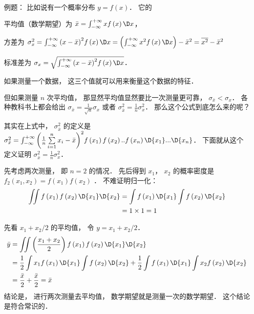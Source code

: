 
例题： 比如说有一个概率分布 $y = f\left( x \right)$．  它的

平均值（数学期望）为 $\bar x = \int_{ - \infty }^{ + \infty } {xf\left( x \right)\D x} $，  

方差为  $\sigma _x^2 = \int_{ - \infty }^{ + \infty } {{{\left( {x - \bar x} \right)}^2}f\left( x \right)\D x}  = \left( {\int_{ - \infty }^{ + \infty } {{x^2}f\left( x \right)\D x} } \right) - {\bar x^2} = \overline {{x^2}}  - {\bar x^2}$ 

标准差为 ${\sigma _x} = \sqrt {\int_{ - \infty }^{ + \infty } {{{\left( {x - \bar x} \right)}^2}f\left( x \right)\D x} } $．  

如果测量一个数据， 这三个值就可以用来衡量这个数据的特征．

但如果测量 $n$ 次平均值， 那显然平均值显然要比一次测量更可靠， ${\sigma _{\bar x}} < {\sigma _x}$．   各种教科书上都会给出 ${\sigma _{\bar x}} = \frac{1}{{\sqrt n }}{\sigma _x}$ 或者 $\sigma _{\bar x}^2 = \frac{1}{n}\sigma _x^2$．  那么这个公式到底怎么来的呢？

其实在上式中， $\sigma _{\bar x}^2$  的定义是 $\sigma _{\bar x}^2 = \int_{ - \infty }^{ + \infty } {{{\left( {\frac{1}{n}\sum\limits_{i = 1}^n {{x_i}}  - \bar x} \right)}^2}f\left( {{x_1}} \right)f\left( {{x_2}} \right)..f\left( {{x_n}} \right)\D {x_1}...\D {x_n}} $．  下面就从这个定义证明 $\sigma _{\bar x}^2 = \frac{1}{n}\sigma _x^2$． 

先考虑两次测量， 即 $n = 2$ 的情况． 先后得到 ${x_1}$，  ${x_2}$ 的概率密度是 ${f_2}\left( {{x_1},{x_2}} \right) = f\left( {{x_1}} \right)f\left( {{x_2}} \right)$ 
．  不难证明归一化：
 \begin{equation}
\begin{aligned}
  \iint {f\left( {{x_1}} \right)f\left( {{x_2}} \right)\D {x_1}\D {x_2}} &= \int {f\left( {{x_1}} \right)\D {x_1}} \int {f\left( {{x_2}} \right)\D {x_2}}  \hfill \\
   &= 1 \times 1 = 1 \hfill \\ 
\end{aligned}
\end{equation}

先看 ${{{x_1} + {x_2}}}/{2}$ 的平均值， 令 $y = {{{x_1} + {x_2}}}/{2}$． 
  \begin{equation}
\begin{aligned}
  \bar y &= \iint {\left( {\frac{{{x_1} + {x_2}}}{2}} \right)f\left( {{x_1}} \right)f\left( {{x_2}} \right)\D {x_1}\D {x_2}} \hfill \\
  & = \frac{1}{2}\int {{x_1}f\left( {{x_1}} \right)\D {x_1}} \int {f\left( {{x_2}} \right)\D {x_2}}  + \frac{1}{2}\int {f\left( {{x_1}} \right)\D {x_1}} \int {{x_2}f\left( {{x_2}} \right)\D {x_2}}  \hfill \\
   &= \frac{{\bar x}}{2} + \frac{{\bar x}}{2} = \bar x \hfill \\ 
\end{aligned} 
\end{equation}
结论是， 进行两次测量去平均值， 数学期望就是测量一次的数学期望． 这个结论是符合常识的．

